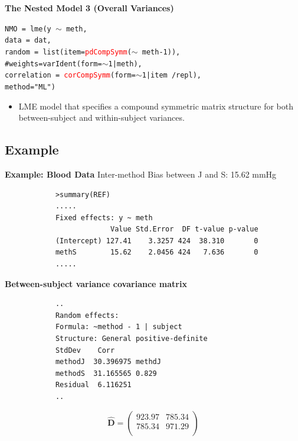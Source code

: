 \documentclass[compress]{beamer}        %
\makeatletter
\newcommand{\tcb}{\textcolor{beamer@blendedblue}}
\newcommand{\tcr}{\textcolor{red}}
\makeatother
\begin{document}
		\begin{frame}[fragile]{\bf \tcb{The Nested Model 3 (Overall Variances)}}
			\vspace{-1cm}
			\begin{framed}
			\texttt{NMO = lme(y $\sim$ meth,\\
				\hspace{0.35cm} data = dat,\\
				\hspace{0.35cm} random = list(item=\tcr{pdCompSymm}($\sim$ meth-1)), \\
				\hspace{0.35cm} \tcb{\#weights=varIdent(form=$\sim$1|meth),}\\
				\hspace{0.35cm} correlation = \tcr{corCompSymm}(form=$\sim$1|item /repl),\\
				\hspace{0.35cm} method="ML")}
			\end{framed}
			\begin{itemize}
				\item LME model that specifies a compound symmetric matrix structure for both between-subject and within-subject variances.
			\end{itemize}
		\end{frame}
		
		
		\subsection[Example]{Example}		

		
		\begin{frame}[fragile]{\bf \tcb{Example: Blood Data}}
			Inter-method Bias between J and S:         15.62 mmHg
			\begin{verbatim}
			>summary(REF)
			.....
			Fixed effects: y ~ meth
			             Value Std.Error  DF t-value p-value
			(Intercept) 127.41    3.3257 424  38.310       0
			methS        15.62    2.0456 424   7.636       0
			.....
			\end{verbatim}
		\end{frame}
		
		\begin{frame}[fragile]{\bf \tcb{Between-subject variance covariance matrix }}
			
			\begin{verbatim}
			..
			Random effects:
			Formula: ~method - 1 | subject
			Structure: General positive-definite
			StdDev    Corr
			methodJ  30.396975 methdJ
			methodS  31.165565 0.829
			Residual  6.116251
			..
			\end{verbatim}
			\[
			\hat{\boldsymbol{D}} = \left(
			\begin{array}{cc}
			923.97	& 785.34 \\
			785.34	& 971.29\\
			\end{array}\right)
			\]
		\end{frame}
		
\end{document}
